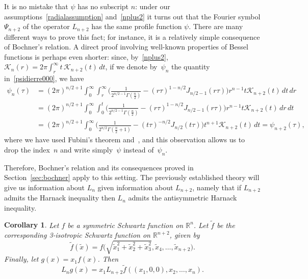 \documentclass[a4paper,12pt,reqno]{amsart}
\numberwithin{equation}{section}
\newtheorem{corollary}[theorem]{Corollary}
\theoremstyle{definition}
\theoremstyle{notation}
\newcommand{\R}{\mathds{R}}
\newcommand{\jj}{{\mathcal{K}}}
\begin{document}
It is no mistake that $\psi$ has no subscript $n$: under our assumptions~\eqref{radialassumption} and~\eqref{nplus2} it turns out that the Fourier symbol $\Psi_{n + 2}$ of the operator $L_{n + 2}$ has the same profile function $\psi$. There are many different ways to prove this fact; for instance, it is a relatively simple consequence of Bochner's relation. A direct proof involving well-known properties of Bessel functions is perhaps even shorter: since, by~\eqref{nplus2}, $\jj_{n}(r) = 2 \pi \int_r^\infty t \,\jj_{n+2}(t) \, dt$, 
if we denote by~$\psi_n$ the quantity in~\eqref{psidierre000},
we have
\begin{align*}
 \psi_{n}(\tau) & = (2 \pi)^{n/2 + 1} \int_0^\infty \int_r^\infty \biggl(\frac{1}{2^{n/2 - 1} \Gamma(\frac{n}{2})} - (r \tau)^{1 - n/2} J_{n/2 - 1}(r \tau)\biggr) r^{n - 1} t \jj_{n + 2}(t) \, dt \, dr \\
 & = (2 \pi)^{n/2 + 1} \int_0^\infty \int_0^t \biggl(\frac{1}{2^{n/2 - 1} \Gamma(\frac{n}{2})} - (r \tau)^{1 - n/2} J_{n/2 - 1}(r \tau)\biggr) r^{n - 1} t \jj_{n + 2}(t) \, dr \, dt \\
 & = (2 \pi)^{n/2 + 1} \int_0^\infty  \biggl(\frac{1}{2^{n/2} \Gamma(\frac{n}{2} + 1)} - (t \tau)^{-n/2} J_{n/2}(t \tau)\biggr) t^{n + 1} \jj_{n + 2}(t) \, dt =\psi_{n+2}(\tau),
\end{align*}
where we have used Fubini's theorem and~\cite[Equation 10.22.1]{NIST:DLMF},
and this observation allows us to drop the index~$n$
and write simply~$\psi$ instead of~$\psi_n$.


Therefore, Bochner's relation and its consequences proved in Section~\ref{sec:bochner} apply to this setting. The previously established theory will give us information about \(L_n\) given information about \(L_{n+2}\), namely that if \(L_{n+2}\) admits the Harnack inequality then \(L_n\) admits the antisymmetric Harnack inequality.




\begin{corollary}
\label{cor:odd:flapBIS}
Let $f$ be a symmetric Schwartz function on $\R^n$. Let $\tilde{f}$ be the corresponding 3-isotropic Schwartz function on $\R^{n + 2}$, given by
\[
    \tilde{f}(\tilde{x}) = f\bigg (\sqrt{\tilde x_1^2 + \tilde x_2^2 + \tilde x_3^2}, \tilde x_4, \ldots, \tilde x_{n+2}\bigg ) .
\]
Finally, let $g(x) = x_1 f(x)$. Then
\[
    L_n g(x) = x_1 L_{n+2} \tilde{f}((x_1, 0, 0), x_2, \ldots, x_n) .
\]
\end{corollary}
\end{document}
